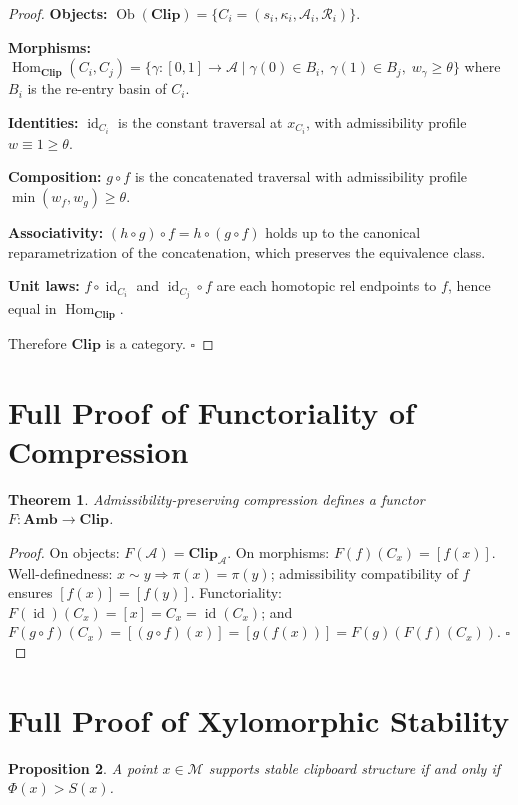 \documentclass[12pt,oneside]{book}
\theoremstyle{plain}
\newtheorem{theorem}{Theorem}[chapter]
\newtheorem{proposition}[theorem]{Proposition}
\theoremstyle{definition}
\theoremstyle{plain}
\DeclareMathOperator{\Hom}{Hom}
\DeclareMathOperator{\Ob}{Ob}
\DeclareMathOperator{\id}{id}
\newcommand{\Clip}{\mathbf{Clip}}
\newcommand{\Amb}{\mathbf{Amb}}
\newcommand{\cA}{\mathcal{A}}
\newcommand{\cM}{\mathcal{M}}
\newcommand{\cR}{\mathcal{R}}
\begin{document}
\begin{proof}
\textbf{Objects:} $\Ob(\Clip) = \{C_i = (s_i, \kappa_i, \cA_i, \cR_i)\}$.

\textbf{Morphisms:} $\Hom_{\Clip}(C_i, C_j) = \{\gamma : [0,1] \to \cA \mid \gamma(0) \in B_i,\; \gamma(1) \in B_j,\; w_\gamma \geq \theta\}$ where $B_i$ is the re-entry basin of $C_i$.

\textbf{Identities:} $\id_{C_i}$ is the constant traversal at $x_{C_i}$, with admissibility profile $w \equiv 1 \geq \theta$.

\textbf{Composition:} $g \circ f$ is the concatenated traversal with admissibility profile $\min(w_f, w_g) \geq \theta$.

\textbf{Associativity:} $(h \circ g) \circ f = h \circ (g \circ f)$ holds up to the canonical reparametrization of the concatenation, which preserves the equivalence class.

\textbf{Unit laws:} $f \circ \id_{C_i}$ and $\id_{C_j} \circ f$ are each homotopic rel endpoints to $f$, hence equal in $\Hom_{\Clip}$.

Therefore $\Clip$ is a category. $\square$
\end{proof}

\section{Full Proof of Functoriality of Compression}

\begin{theorem}
Admissibility-preserving compression defines a functor $F : \Amb \to \Clip$.
\end{theorem}

\begin{proof}
On objects: $F(\cA) = \Clip_\cA$. On morphisms: $F(f)(C_x) = [f(x)]$. Well-definedness: $x \sim y \Rightarrow \pi(x) = \pi(y)$; admissibility compatibility of $f$ ensures $[f(x)] = [f(y)]$. Functoriality: $F(\id)(C_x) = [x] = C_x = \id(C_x)$; and $F(g \circ f)(C_x) = [(g \circ f)(x)] = [g(f(x))] = F(g)(F(f)(C_x))$. $\square$
\end{proof}

\section{Full Proof of Xylomorphic Stability}

\begin{proposition}
A point $x \in \cM$ supports stable clipboard structure if and only if $\Phi(x) > S(x)$.
\end{proposition}
\end{document}
